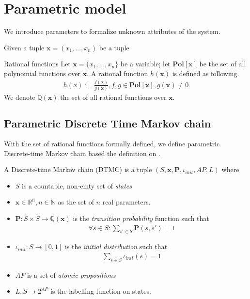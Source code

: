 \section{Parametric model}
We introduce parameters to formalize unknown attributes of the system.
\begin{definition}
    Given a tuple $\mathbf{x}=(x_1,\ldots,x_n)$ be a tuple
\end{definition}

\begin{definition}{Rational functions}
    Let $\mathbf{x}=\{x_1,\ldots,x_n\}$ be a variable; let $\mathbf{Pol}[\mathbf{x}]$ be the set of
    all polynomial functions over $\mathbf{x}$. A rational function $h(\mathbf{x})$ is defined
    as following.
    \begin{align*}
        h(x) := \frac{f(\mathbf{x})}{g(\mathbf{x})}, f,g\in\mathbf{Pol}[\mathbf{x}], g(\mathbf{x}) \neq 0
    \end{align*}
    We denote $\mathbb{Q}(\mathbf{x})$ the set of all rational functions over $\mathbf{x}$.
\end{definition}


\subsection{Parametric Discrete Time Markov chain}
With the set of rational functions formally defined, we define parametric Discrete-time Markov chain
based the definition on \cite{junges2019parameter}.
\begin{definition}
    A Discrete-time Markov chain (DTMC) is a tuple $(S, \mathbf{x}, \mathbf{P}, \iota_{init}, AP, L)$
    where
    \begin{itemize}
        \item $S$ is a countable, non-emty set of \textit{states}
        \item $\mathbf{x} \in \mathbb{R}^n, n \in \mathbb{N}$ as the set of $n$ real parameters.
        \item $\mathbf{P}:S\times S \rightarrow \mathbb{Q}(\mathbf{x})$ is the \textit{transition
                  probability} function such that
              \begin{align*}
                  \forall s \in S : \sum_{s'\in S}\mathbf{P}(s, s') = 1
              \end{align*}
        \item $\iota_{init}: S \rightarrow [0,1]$ is the \textit{initial distribution} such that
              \begin{align*}
                  \sum_{s\in S}\iota_{init}(s) = 1
              \end{align*}
        \item $AP$ is a set of \textit{atomic propositions}
        \item $L: S \rightarrow 2^{AP}$ is the labelling function on states.
    \end{itemize}
\end{definition}

